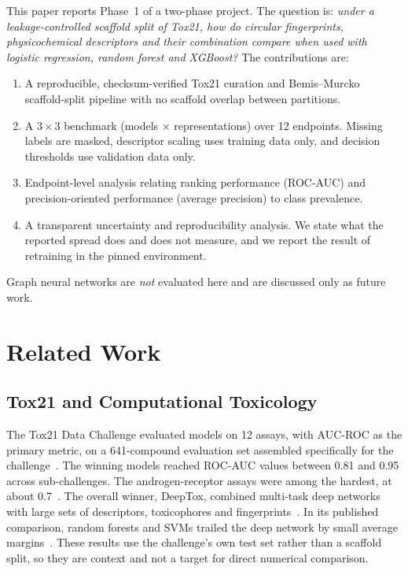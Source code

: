 \documentclass[conference]{IEEEtran}
\begin{document}
This paper reports Phase~1 of a two-phase project. The question is: \emph{under a leakage-controlled scaffold split of Tox21, how do circular fingerprints, physicochemical descriptors and their combination compare when used with logistic regression, random forest and XGBoost?} The contributions are:
\begin{enumerate}
\item A reproducible, checksum-verified Tox21 curation and Bemis--Murcko scaffold-split pipeline with no scaffold overlap between partitions.
\item A $3\times3$ benchmark (models $\times$ representations) over 12 endpoints. Missing labels are masked, descriptor scaling uses training data only, and decision thresholds use validation data only.
\item Endpoint-level analysis relating ranking performance (ROC-AUC) and precision-oriented performance (average precision) to class prevalence.
\item A transparent uncertainty and reproducibility analysis. We state what the reported spread does and does not measure, and we report the result of retraining in the pinned environment.
\end{enumerate}
Graph neural networks are \emph{not} evaluated here and are discussed only as future work.

\section{Related Work}
\subsection{Tox21 and Computational Toxicology}
The Tox21 Data Challenge evaluated models on 12 assays, with AUC-ROC as the primary metric, on a 641-compound evaluation set assembled specifically for the challenge~\cite{huang2016tox21}. The winning models reached ROC-AUC values between 0.81 and 0.95 across sub-challenges. The androgen-receptor assays were among the hardest, at about 0.7~\cite{huang2016tox21}. The overall winner, DeepTox, combined multi-task deep networks with large sets of descriptors, toxicophores and fingerprints~\cite{mayr2016deeptox}. In its published comparison, random forests and SVMs trailed the deep network by small average margins~\cite{mayr2016deeptox}. These results use the challenge's own test set rather than a scaffold split, so they are context and not a target for direct numerical comparison.
\end{document}
